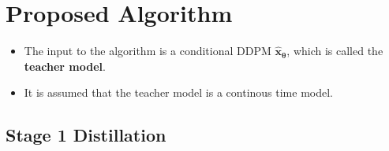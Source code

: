 \documentclass[10pt]{article}
\newcommand{\ve}[1]{\mathbf{#1}}
\newcommand{\ves}[1]{\boldsymbol{#1}}
\begin{document}
\section{Proposed Algorithm}

\begin{itemize}
  \item The input to the algorithm is a conditional DDPM $\hat{\ve{x}}_{\ves{\theta}}$, which is called the {\bf teacher model}.
  
  \item It is assumed that the teacher model is a continous time model.
\end{itemize}

\subsection{Stage 1 Distillation}
\end{document}
